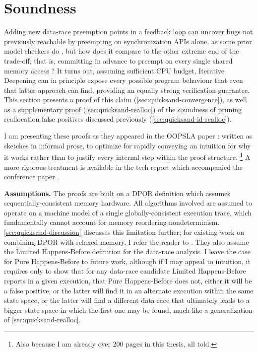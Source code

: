 \section{Soundness}
\label{sec:quicksand-soundness}

Adding new data-race preemption points in a feedback loop can uncover bugs
not previously reachable by preempting on synchronization APIs alone,
as some prior model checkers do \cite{dbug-ssv},
but how does it compare to the other extreme end of the trade-off,
that is,
committing in advance to preempt on every single shared memory access \cite{spin,inspect}?
It turns out,
assuming sufficient CPU budget,
Iterative Deepening can in principle expose every possible program behaviour that
even that latter approach can find,
providing an equally strong verification guarantee.
This section presents a proof of this claim (\cref{sec:quicksand-convergence}),
as well as a supplementary proof (\cref{sec:quicksand-realloc})
of the soundness of pruning reallocation false positives discussed previously (\cref{sec:quicksand-id-realloc}).

I am presenting these proofs as they appeared in the OOPSLA paper \cite{quicksand}:
written as sketches in informal prose,
to optimize for rapidly conveying an intuition for why it works
rather than to justify every internal step within the proof structure.%
\footnote{Also because I am already over 200 pages in this thesis, all told.}
A more rigorous treatment
is available in the tech report which accompanied the conference paper \cite{quicksand-soundness}.

{\bf Assumptions.}
The proofs are built on a DPOR definition which assumes sequentially-consistent memory hardware.
All algorithms involved are assumed to operate on a machine model of a single globally-consistent execution trace,
which fundamentally cannot account for memory reordering nondeterminism.
\cref{sec:quicksand-discussion} discusses this limitation further;
for existing work on combining DPOR with relaxed memory, I refer the reader to \cite{tsopso}.
They also assume the Limited Happens-Before definition
for the data-race analysis.
I leave the case for Pure Happens-Before to future work,
although if I may appeal to intuition,
it requires only to show that for any data-race candidate
Limited Happens-Before reports in a given execution,
that Pure Happens-Before does not,
either it will be a false positive,
or the latter will find it in an alternate execution within the same state space,
or the latter will find a different data race that ultimately leads to a bigger state space in which the first one may be found,
much like a generalization of \cref{sec:quicksand-realloc}.

